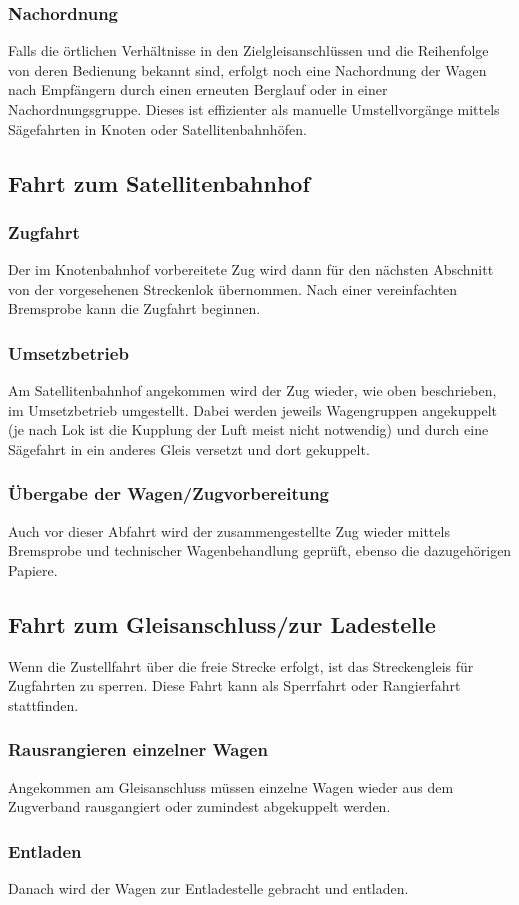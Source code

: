 \subsubsection{Nachordnung}\label{sec:Nachordnung}
Falls die örtlichen Verhältnisse in den Zielgleisanschlüssen und die Reihenfolge von deren Bedienung bekannt sind, erfolgt noch eine Nachordnung der Wagen nach Empfängern durch einen erneuten Berglauf oder in einer Nachordnungsgruppe. Dieses ist effizienter als manuelle Umstellvorgänge mittels Sägefahrten in Knoten oder Satellitenbahnhöfen.

\subsection{Fahrt zum Satellitenbahnhof}
\subsubsection{Zugfahrt}\label{sec:Zugfahrt2}
Der im Knotenbahnhof vorbereitete Zug wird dann für den nächsten Abschnitt von der vorgesehenen Streckenlok übernommen. Nach einer vereinfachten \gls{Bremsprobe} kann die \gls{Zugfahrt} beginnen.\par
\subsubsection{Umsetzbetrieb}\label{sec:Umsetzbetrieb}
Am Satellitenbahnhof angekommen wird der Zug wieder, wie oben beschrieben, im Umsetzbetrieb umgestellt. Dabei werden
jeweils Wagengruppen angekuppelt (je nach Lok ist die Kupplung der Luft meist nicht notwendig) und durch eine Sägefahrt in ein anderes Gleis versetzt und dort gekuppelt.
\subsubsection{Übergabe der Wagen/Zugvorbereitung}
Auch  vor  dieser  Abfahrt  wird der  zusammengestellte  Zug wieder mittels \gls{Bremsprobe} und technischer Wagenbehandlung geprüft, ebenso die dazugehörigen Papiere.

\subsection{Fahrt zum Gleisanschluss/zur Ladestelle}\label{sec:FahrtGA}
Wenn die Zustellfahrt über die freie Strecke erfolgt, ist das Streckengleis für Zugfahrten zu sperren. Diese Fahrt kann als Sperrfahrt oder Rangierfahrt stattfinden.
\subsubsection{Rausrangieren einzelner Wagen}\label{sec:RausrangWagen}
Angekommen am \gls{Gleisanschluss} müssen einzelne Wagen wieder aus dem \gls{Zugverband} rausgangiert oder zumindest abgekuppelt werden.
\subsubsection{Entladen}
Danach wird der Wagen zur Entladestelle gebracht und entladen.